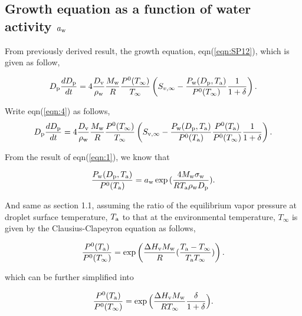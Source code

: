 \documentclass[12pt]{article}
\begin{document}
\subsection{Growth equation as a function of water activity $a_{\rm w}$}

From previously derived result, the growth equation, eqn(\ref{eqn:SP12}), which is given as follow,

\begin{equation}\label{eqn:4}
D_{\rm p}\frac{dD_{\rm p}}{dt}=4 \frac{D_{\rm v}} {\rho_{\rm w}} \frac{M_{\rm w}}{R} \frac{P^{\rm 0}(T_{\infty})} {T_{\infty}} \left(S_{v, \infty} - \frac{P_{\rm w}(D_{\rm p}, T_{\rm a})}{P^{\rm 0}(T_{\infty})} \frac{1}{1+\delta}\right).
\end{equation}

Write eqn(\ref{eqn:4}) as follows,
\begin{equation}\label{eqn:5}
D_{\rm p}\frac{dD_{\rm p}}{dt}=4 \frac{D_{\rm v}} {\rho_{\rm w}} \frac{M_{\rm w}}{R} \frac{P^{\rm 0}(T_{\infty})} {T_{\infty}} \left(S_{\rm v, \infty} - \frac{P_{\rm w}(D_{\rm p}, T_{\rm a})}{P^{\rm 0}(T_{\rm a})} \frac{P^{\rm 0}(T_{\rm a})}{P^{\rm 0}(T_{\infty})}\frac{1}{1+\delta}\right).
\end{equation}

From the result of eqn(\ref{eqn:1}), we know that 

\begin{equation}\label{eqn:6}
\frac{P_{\rm w}(D_{\rm p}, T_{\rm a})}{P^{\rm 0}(T_{\rm a})}=a_{\rm w}\exp{(\frac{4 M_{\rm w} \sigma_{\rm w}}{R T_{\rm a} \rho_{\rm w}D_{\rm p}})}.
\end{equation}

And same as section 1.1, assuming the ratio of the equilibrium vapor pressure at droplet surface temperature, $T_{\rm a}$ to that at the environmental temperature, $T_{\infty}$ is given by the Clausius-Clapeyron equation as follows,
  
\begin{equation}\label{eqn:7}
\frac{P^{\rm 0}(T_{\rm a})}{P^{\rm 0}(T_{\infty})}=\exp \left(\frac{\Delta H_{\rm v} M_{\rm w}}{R} (\frac{T_{\rm a}-T_{\infty}}{T_{\rm a} T_{\infty}})\right).
\end{equation}

which can be further simplified into 

\begin{equation}\label{eqn:8}
\frac{P^{\rm 0}(T_{\rm a})}{P^{\rm 0}(T_{\infty})}=\exp \Big(\frac{\Delta H_{\rm v} M_{\rm w}}{R T_{\infty}} \frac{\delta}{1+\delta}\Big).
\end{equation}
\end{document}
